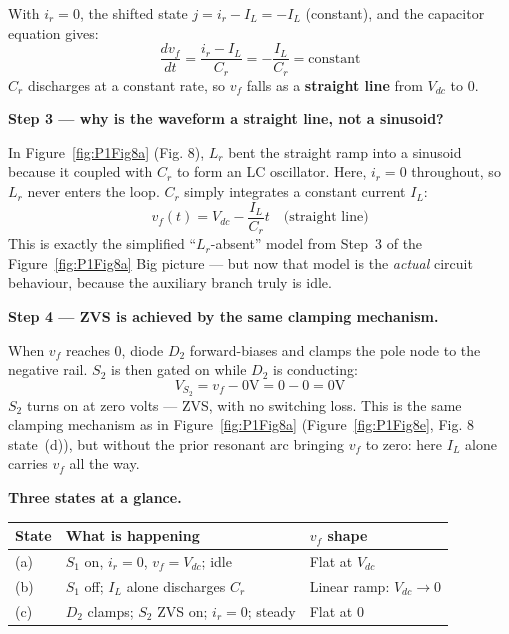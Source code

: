 \documentclass[12pt, a4paper]{article}
\def\,{ }%
\newcommand{\Vdc}{V_{dc}}
\newcommand{\vf}{v_f}
\newcommand{\ir}{i_r}
\newcommand{\IL}{I_L}
\newcommand{\Lr}{L_r}
\newcommand{\figref}[1]{Figure~\ref{#1}}
\begin{document}
With $\ir = 0$, the shifted state $j = \ir - \IL = -\IL$ (constant),
and the capacitor equation gives:
\begin{equation}
    \frac{d\vf}{dt} = \frac{\ir - \IL}{C_r} = -\frac{\IL}{C_r}
    = \text{constant}
    \label{eq:natural_discharge9}
\end{equation}
$C_r$ discharges at a constant rate, so $\vf$ falls as a
\textbf{straight line} from $\Vdc$ to $0$.

\medskip
\textbf{Step 3 --- why is the waveform a straight line, not a sinusoid?}

In \figref{fig:P1Fig8a} (Fig.\,8), $\Lr$ bent the straight ramp into
a sinusoid because it coupled with $C_r$ to form an LC oscillator.
Here, $\ir = 0$ throughout, so $\Lr$ never enters the loop.
$C_r$ simply integrates a constant current $\IL$:
\[
    \vf(t) = \Vdc - \frac{\IL}{C_r}\,t \quad \text{(straight line)}
\]
This is exactly the simplified ``$\Lr$-absent'' model from Step~3 of
the \figref{fig:P1Fig8a} Big picture --- but now that model is the \emph{actual}
circuit behaviour, because the auxiliary branch truly is idle.

\medskip
\textbf{Step 4 --- ZVS is achieved by the same clamping mechanism.}

When $\vf$ reaches $0$, diode $D_2$ forward-biases and clamps the
pole node to the negative rail.
$S_2$ is then gated on while $D_2$ is conducting:
\[
    V_{S_2} = \vf - 0\,\text{V} = 0 - 0 = 0\,\text{V}
\]
$S_2$ turns on at zero volts --- ZVS, with no switching loss.
This is the same clamping mechanism as in \figref{fig:P1Fig8a}
(\figref{fig:P1Fig8e}, Fig.\,8 state~(d)), but without the prior resonant arc bringing
$\vf$ to zero: here $\IL$ alone carries $\vf$ all the way.

\medskip
\textbf{Three states at a glance.}

\begin{center}
\renewcommand{\arraystretch}{1.25}
\begin{tabular}{p{1.0cm} p{6.2cm} p{5.0cm}}
\toprule
\textbf{State} & \textbf{What is happening} & \textbf{$\vf$ shape} \\
\midrule
(a) & $S_1$ on, $\ir=0$, $\vf=\Vdc$; idle &
      Flat at $\Vdc$ \\
(b) & $S_1$ off; $\IL$ alone discharges $C_r$ &
      Linear ramp: $\Vdc \to 0$ \\
(c) & $D_2$ clamps; $S_2$ ZVS on; $\ir=0$; steady &
      Flat at $0$ \\
\bottomrule
\end{tabular}
\end{center}
\end{document}

